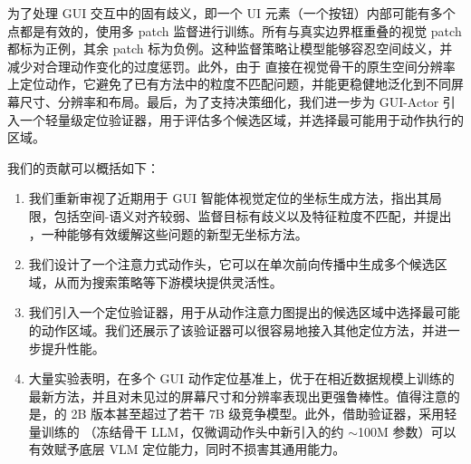为了处理 GUI 交互中的固有歧义，即一个 UI 元素（\eg 一个按钮）内部可能有多个点都是有效的，\sys 使用多 patch 监督进行训练。所有与真实边界框重叠的视觉 patch 都标为正例，其余 patch 标为负例。这种监督策略让模型能够容忍空间歧义，并减少对合理动作变化的过度惩罚。此外，由于 \sys 直接在视觉骨干的原生空间分辨率上定位动作，它避免了已有方法中的粒度不匹配问题，并能更稳健地泛化到不同屏幕尺寸、分辨率和布局。最后，为了支持决策细化，我们进一步为 GUI-Actor 引入一个轻量级定位验证器，用于评估多个候选区域，并选择最可能用于动作执行的区域。

我们的贡献可以概括如下：
\begin{enumerate}[leftmargin=*, label=\arabic*.]
    \item 我们重新审视了近期用于 GUI 智能体视觉定位的坐标生成方法，指出其局限，包括空间-语义对齐较弱、监督目标有歧义以及特征粒度不匹配，并提出 \sys，一种能够有效缓解这些问题的新型无坐标方法。
    \item 我们设计了一个注意力式动作头，它可以在单次前向传播中生成多个候选区域，从而为搜索策略等下游模块提供灵活性。
    \item 我们引入一个定位验证器，用于从动作注意力图提出的候选区域中选择最可能的动作区域。我们还展示了该验证器可以很容易地接入其他定位方法，并进一步提升性能。
    \item 大量实验表明，在多个 GUI 动作定位基准上，\sys 优于在相近数据规模上训练的最新方法，并且对未见过的屏幕尺寸和分辨率表现出更强鲁棒性。值得注意的是，\sys 的 2B 版本甚至超过了若干 7B 级竞争模型。此外，借助验证器，采用轻量训练的 \sys（\ie 冻结骨干 LLM，仅微调动作头中新引入的约 $\sim$100M 参数）可以有效赋予底层 VLM 定位能力，同时不损害其通用能力。
\end{enumerate}
